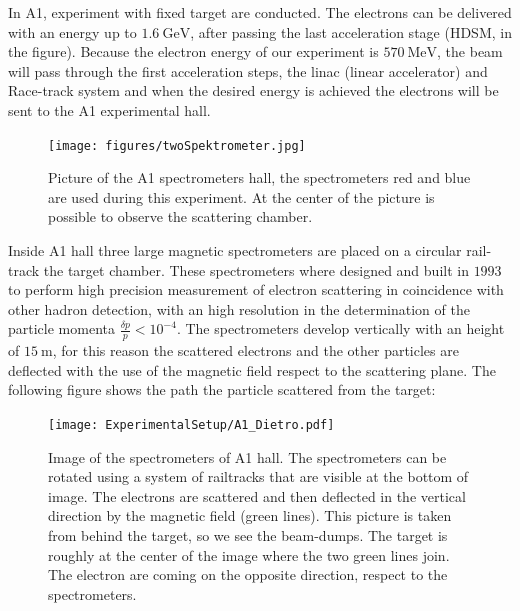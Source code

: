 In A1, experiment with fixed target are conducted. The electrons can be delivered with an energy up to $\SI{1.6}{\giga \electronvolt}$, after passing the last acceleration stage (HDSM, in the figure). Because the electron energy of our experiment is $\SI{570}{\mega \electronvolt}$, the beam will pass through the first acceleration steps, the linac (linear accelerator) and Race-track system and when the desired energy is achieved the electrons will be sent to the A1 experimental hall. 

\begin{figure}[hbtp]
\centering
\texttt{[image: figures/twoSpektrometer.jpg]}
\caption{Picture of the A1 spectrometers hall, the spectrometers red and blue are used during this experiment. At the center of the picture is possible to observe the scattering chamber.}
\end{figure}


Inside A1 hall three large magnetic spectrometers are placed on a circular rail-track the target chamber. These spectrometers where designed and built in $1993$ to perform high precision measurement of electron scattering in coincidence with other hadron detection, with an high resolution in the determination of the particle momenta $\frac{\delta p}{p} < 10^{-4}$. The spectrometers develop vertically with an height of $\SI{15}{\meter}$, for this reason the scattered electrons and the other particles are deflected with the use of the magnetic field respect to the scattering plane. The following figure shows the path the particle scattered from the target:

\begin{figure}
\centering
\caption{Image of the spectrometers of A1 hall. The spectrometers can be rotated using a system of railtracks that are visible at the bottom of image. The electrons are scattered and then deflected in the vertical direction by the magnetic field (green lines). This picture is taken from behind the target, so we see the beam-dumps. The target is roughly at the center of the image where the two green lines join. The electron are coming on the opposite direction, respect to the spectrometers.}\label{fig:TwoDetectors}
\texttt{[image: ExperimentalSetup/A1\_Dietro.pdf]}
\end{figure}


